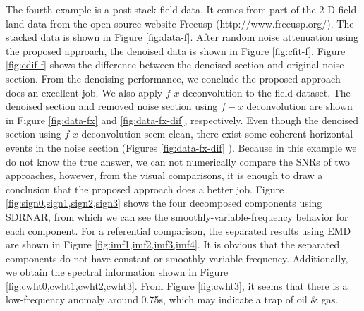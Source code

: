 The fourth example is a post-stack field data. It comes from part of the 2-D field land data from the open-source website Freeusp 
(http://www.freeusp.org/). The stacked data is shown in Figure \ref{fig:data-f}. After random noise attenuation using the proposed approach, the denoised data is shown in Figure \ref{fig:cfit-f}. Figure \ref{fig:cdif-f} shows the difference between the denoised section and original noise section. From the denoising performance, we conclude the proposed approach does an excellent job. We also apply $f$-$x$ deconvolution  to the field dataset. The denoised section and removed noise section using $f-x$ deconvolution are shown in Figure \ref{fig:data-fx} and \ref{fig:data-fx-dif}, respectively.  Even though the denoised section using $f$-$x$ deconvolution  seem clean, there exist some coherent horizontal events in the noise section (Figures \ref{fig:data-fx-dif} ). Because in this example we do not know the true answer, we can not numerically compare the SNRs of two approaches, however, from the visual comparisons, it is enough to draw a conclusion that the proposed approach does a better job.  Figure \ref{fig:sign0,sign1,sign2,sign3} shows the four decomposed components using SDRNAR, from which we can see the smoothly-variable-frequency behavior for each component. For a referential comparison, the separated results using EMD are shown in Figure \ref{fig:imf1,imf2,imf3,imf4}. It is obvious that the separated components do not have constant or smoothly-variable frequency. Additionally, we obtain the spectral information shown in Figure \ref{fig:cwht0,cwht1,cwht2,cwht3}. From Figure \ref{fig:cwht3}, it seems that there is a low-frequency anomaly around 0.75\wen{ }s, which may indicate a trap of oil \& gas. 



